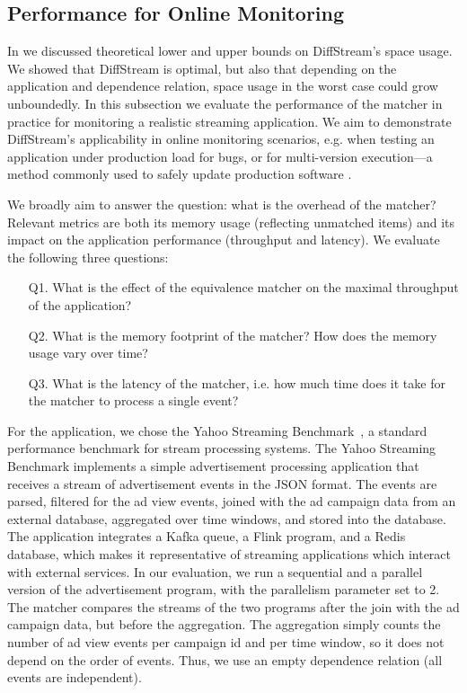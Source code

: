 \subsection{Performance for Online Monitoring}
\label{diffstream:ssec:evaluation-onlinemonitoring}

In  we discussed theoretical lower
and upper bounds on DiffStream's space usage. We showed that DiffStream is
optimal, but also that depending on the application and dependence relation, space usage in the worst case could grow unboundedly. In this subsection we
evaluate the performance of the matcher in practice for monitoring a realistic streaming application.
We aim to demonstrate DiffStream's applicability in online monitoring scenarios,
e.g. when testing an application under production load for bugs,
or for multi-version execution---a method commonly used to safely update
production software
\cite{tucek2009delta-execution,hosek2013safe,maurer2012tachyon}.

We broadly aim to answer the question: what is the overhead of the matcher?
Relevant metrics are both its memory usage (reflecting unmatched items) and its impact on the application performance (throughput and latency). We evaluate the following three questions:
\begin{enumerate}
  \item[Q1.] What is the effect of the equivalence matcher on the maximal
  throughput of the application?
  \item[Q2.] What is the memory footprint of the matcher? How does the memory usage vary over time?
  \item[Q3.] What is the latency of the matcher, i.e. how much time does
  it take for the matcher to process a single event?
\end{enumerate}

For the application, we chose the Yahoo Streaming
Benchmark~\cite{yahoostreaming2016}, a standard performance benchmark for stream processing systems.
The Yahoo
Streaming Benchmark implements a simple advertisement processing application
that receives a stream of advertisement events in the JSON format. The events
are parsed, filtered for the ad view events, joined with the ad campaign data
from an external database, aggregated over time windows, and stored into the
database. The application integrates a Kafka queue, a Flink program, and a
Redis database,
which makes it representative of streaming applications which interact with external services.
In our evaluation, we run a sequential and a parallel version of the
advertisement program, with the parallelism parameter set to 2. The
matcher compares the streams of the two programs
after the join with the ad campaign data,
but before the aggregation. The aggregation simply counts the number of
ad view events per campaign id and per time window, so it does not depend on
the order of events. Thus, we use an empty dependence relation (all events
are independent).

